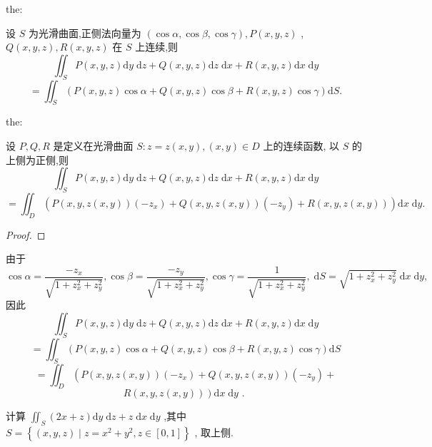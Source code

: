 \begin{theorem}{}{the:}

\end{theorem}
 设 \(S\) 为光滑曲面,正侧法向量为 \(\left( {\cos \alpha ,\cos \beta ,\cos \gamma }\right) ,P\left( {x,y,z}\right)\) , \(Q\left( {x,y,z}\right) ,R\left( {x,y,z}\right)\) 在 \(S\) 上连续,则
\[
{\iint }_{S}P\left( {x,y,z}\right) \mathrm{d}y\mathrm{\;d}z + Q\left( {x,y,z}\right) \mathrm{d}z\mathrm{\;d}x + R\left( {x,y,z}\right) \mathrm{d}x\mathrm{\;d}y
\]
\[
= {\iint }_{S}\left( {P\left( {x,y,z}\right) \cos \alpha  + Q\left( {x,y,z}\right) \cos \beta  + R\left( {x,y,z}\right) \cos \gamma }\right) \mathrm{d}S.
\]
\begin{theorem}{}{the:}

\end{theorem}
 设 \(P,Q,R\) 是定义在光滑曲面 \(S : z = z\left( {x,y}\right) ,\left( {x,y}\right)  \in  D\) 上的连续函数, 以 \(S\) 的上侧为正侧,则
\[
{\iint }_{S}P\left( {x,y,z}\right) \mathrm{d}y\mathrm{\;d}z + Q\left( {x,y,z}\right) \mathrm{d}z\mathrm{\;d}x + R\left( {x,y,z}\right) \mathrm{d}x\mathrm{\;d}y
\]
\[
= {\iint }_{D}\left( {P\left( {x,y,z\left( {x,y}\right) }\right) \left( {-{z}_{x}}\right)  + Q\left( {x,y,z\left( {x,y}\right) }\right) \left( {-{z}_{y}}\right)  + R\left( {x,y,z\left( {x,y}\right) }\right) }\right) \mathrm{d}x\mathrm{\;d}y.
\]
\begin{proof}

\end{proof}
由于
\[
\cos \alpha  = \frac{-{z}_{x}}{\sqrt{1 + {z}_{x}^{2} + {z}_{y}^{2}}},\cos \beta  = \frac{-{z}_{y}}{\sqrt{1 + {z}_{x}^{2} + {z}_{y}^{2}}},\cos \gamma  = \frac{1}{\sqrt{1 + {z}_{x}^{2} + {z}_{y}^{2}}},\mathrm{\;d}S = \sqrt{1 + {z}_{x}^{2} + {z}_{y}^{2}}\mathrm{\;d}x\mathrm{\;d}y,
\]
因此
\[
{\iint }_{S}P\left( {x,y,z}\right) \mathrm{d}y\mathrm{\;d}z + Q\left( {x,y,z}\right) \mathrm{d}z\mathrm{\;d}x + R\left( {x,y,z}\right) \mathrm{d}x\mathrm{\;d}y
\]
\[
= {\iint }_{S}\left( {P\left( {x,y,z}\right) \cos \alpha  + Q\left( {x,y,z}\right) \cos \beta  + R\left( {x,y,z}\right) \cos \gamma }\right) \mathrm{d}S
\]
\[
= {\iint }_{D}\left( {P\left( {x,y,z\left( {x,y}\right) }\right) \left( {-{z}_{x}}\right)  + Q\left( {x,y,z\left( {x,y}\right) }\right) \left( {-{z}_{y}}\right)  + }\right.
\]
\[
\left. {R\left( {x,y,z\left( {x,y}\right) }\right) }\right) \mathrm{d}x\mathrm{\;d}y\text{ . }
\]
\begin{example}

\end{example}
计算 \({\iint }_{S}\left( {{2x} + z}\right) \mathrm{d}y\mathrm{\;d}z + z\mathrm{\;d}x\mathrm{\;d}y\) ,其中 \(S = \left\{  {\left( {x,y,z}\right)  \mid  z = {x}^{2} + {y}^{2},z \in  \left\lbrack  {0,1}\right\rbrack  }\right\}\) , 取上侧.

